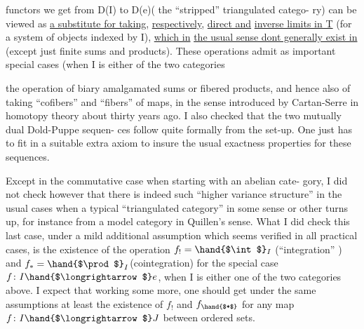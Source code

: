 
functors we get from D(I)  to  D(e)( the ``stripped'' triangulated catego-%
ry) can be viewed as \uline{a substitute for taking},  \uline{respectively},  \uline{direct and}
\uline{inverse limits in T} (for a system of objects indexed by I),  \uline{which in}
\uline{the usual sense dont generally exist in}  (except just finite sums and
products).  These operations admit as important special cases (when I
is either of the two categories

\margin{(**)}

the operation of \hand{(}biary\hand{)} amalgamated sums or fibered products,  and
hence also of taking ``cofibers'' and  ``fibers'' of maps,  in the 
 sense introduced by Cartan-Serre in homotopy theory about thirty
years ago.  I also checked that the two mutually dual Dold-Puppe sequen-%
ces follow quite formally from the set-up.  One just has to fit in a
suitable extra axiom to insure the usual exactness properties for these
sequences.

Except in the commutative case when starting with an abelian cate-%
gory, I did not check however that  there is indeed such ``higher
variance structure'' in the usual cases\hand{,} when a typical ``triangulated
category'' in some sense or other turns up,  for instance from a model
category in Quillen's sense.  What I did check  this last case,  under
a mild additional assumption which seems verified in all practical cases,
is the existence of the operation  $f_! = \hand{$\int$}_I$  (``integration'' ) and
$f_* = \hand{$\prod$}_I$(cointegration) for the special case $f\colon I \hand{$\longrightarrow$} e$,  when I is either
one of the two categories\inserted{(**)} above.  I expect that working some more,  one
should get under the same assumptions  at least the existence of
$f_!$ and $f_{\hand{$*$}}$  for any map $f\colon I \hand{$\longrightarrow$} J$ between ordered sets.

